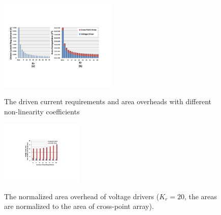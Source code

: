 %
\begin{figure}%
\centering
  \includegraphics[width=0.5\textwidth]{./figures/area_all.pdf}\\
  \vspace{-5pt}
  \caption{The driven current requirements and area overheads with different non-linearity coefficients}\label{fig:area_all}
 \vspace{-15pt}
\end{figure}


\begin{figure}%
\centering
  \includegraphics[width=0.35\textwidth]{./figures/Area_kr20_f.pdf}\\
  \caption{The normalized area overhead of voltage drivers ($K_r=20$, the areas are normalized to the area of cross-point array). }\label{fig:Area_kr20}
\end{figure}

